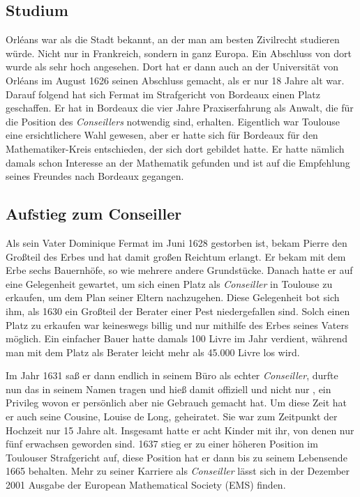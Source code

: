 \subsection{Studium} \label{sec:studium}
Orléans war als die Stadt bekannt, an der man am besten Zivilrecht studieren würde. Nicht nur in Frankreich, sondern in ganz Europa. Ein Abschluss von dort wurde als sehr hoch angesehen. Dort hat er dann auch an der Universität von Orléans im August 1626 seinen Abschluss gemacht, als er nur 18 Jahre alt war. Darauf folgend hat sich Fermat im Strafgericht von Bordeaux einen Platz geschaffen. Er hat in Bordeaux die vier Jahre Praxiserfahrung als Anwalt, die für die Position des \textit{Conseillers} notwendig sind, erhalten. Eigentlich war Toulouse eine ersichtlichere Wahl gewesen, aber er hatte sich für Bordeaux für den Mathematiker-Kreis entschieden, der sich dort gebildet hatte. Er hatte nämlich damals schon Interesse an der Mathematik gefunden und ist auf die Empfehlung seines Freundes nach Bordeaux gegangen.

\subsection{Aufstieg zum Conseiller} \label{sec:aufstieg}
Als sein Vater Dominique Fermat im Juni 1628 gestorben ist, bekam Pierre den Großteil des Erbes und hat damit großen Reichtum erlangt. Er bekam mit dem Erbe sechs Bauernhöfe, so wie mehrere andere Grundstücke. Danach hatte er auf eine Gelegenheit gewartet, um sich einen Platz als \textit{Conseiller} in Toulouse zu erkaufen, um dem Plan seiner Eltern nachzugehen. Diese Gelegenheit bot sich ihm, als 1630 ein Großteil der Berater einer Pest niedergefallen sind. Solch einen Platz zu erkaufen war keineswegs billig und nur mithilfe des Erbes seines Vaters möglich. Ein einfacher Bauer hatte damals 100 Livre im Jahr verdient, während man mit dem Platz als Berater leicht mehr als 45.000 Livre los wird.

Im Jahr 1631 saß er dann endlich in seinem Büro als echter \textit{Conseiller}, durfte nun das \textit{} in seinem Namen tragen und hieß damit offiziell  und nicht nur , ein Privileg wovon er persönlich aber nie Gebrauch gemacht hat. Um diese Zeit hat er auch seine Cousine, Louise de Long, geheiratet. Sie war zum Zeitpunkt der Hochzeit nur 15 Jahre alt. Insgesamt hatte er acht Kinder mit ihr, von denen nur fünf erwachsen geworden sind. 1637 stieg er zu einer höheren Position im Toulouser Strafgericht auf, diese Position hat er dann bis zu seinem Lebensende 1665 behalten. Mehr zu seiner Karriere als \textit{Conseiller} lässt sich in der Dezember 2001 Ausgabe der European Mathematical Society (EMS) finden. \cite{barnerNewspaper}

